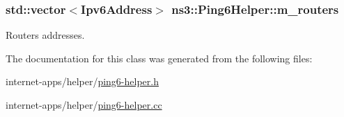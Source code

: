 \subsubsection[{\texorpdfstring{m\+\_\+routers}{m_routers}}]{\setlength{\rightskip}{0pt plus 5cm}std\+::vector$<${\bf Ipv6\+Address}$>$ ns3\+::\+Ping6\+Helper\+::m\+\_\+routers\hspace{0.3cm}{\ttfamily [private]}}\hypertarget{classns3_1_1Ping6Helper_a734952847b4f6330fb41113cbfc9c633}{}\label{classns3_1_1Ping6Helper_a734952847b4f6330fb41113cbfc9c633}


Routers addresses. 



The documentation for this class was generated from the following files\+:\begin{DoxyCompactItemize}
\item 
internet-\/apps/helper/\hyperlink{ping6-helper_8h}{ping6-\/helper.\+h}\item 
internet-\/apps/helper/\hyperlink{ping6-helper_8cc}{ping6-\/helper.\+cc}\end{DoxyCompactItemize}

